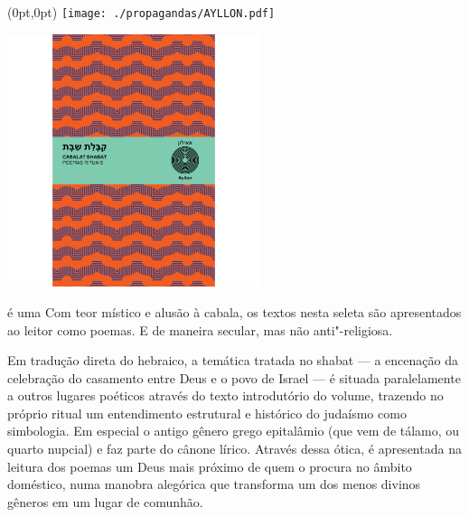 \pagestyle{ayllon}
\label{ayllon}


\begin{textblock*}{5.625in}(0pt,0pt)%
\vspace*{-3.49cm}
\hspace*{-2.76cm}\texttt{[image: ./propagandas/AYLLON.pdf]}
\end{textblock*}

\pagebreak %

\begin{center}
\hspace*{-3.6cm}
\hspace*{3.1cm}\includegraphics[width=74mm]{./grid/cabalat.png}
\end{center}

\hspace*{-7cm}\hrulefill\hspace*{-7cm}

\medskip

 é uma  Com teor místico e alusão à cabala, os textos nesta seleta são apresentados ao leitor como poemas. E de maneira secular, mas não anti"-religiosa.

Em tradução direta do hebraico, a temática tratada no shabat --- a encenação da celebração do casamento entre Deus e o povo de Israel --- é situada paralelamente a outros lugares poéticos através do texto introdutório do volume, trazendo no próprio ritual um entendimento estrutural e histórico do judaísmo como simbologia. Em especial o antigo gênero grego epitalâmio (que vem de tálamo, ou quarto nupcial) e faz parte do cânone lírico. Através dessa ótica, é apresentada na leitura dos poemas um Deus mais próximo de quem o procura no âmbito doméstico, numa manobra alegórica que transforma um dos menos divinos gêneros em um lugar de comunhão.


